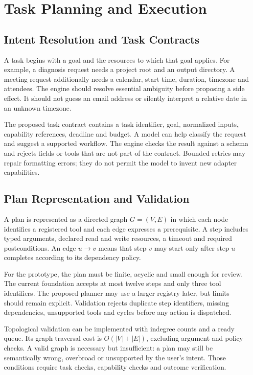 \chapter{Task Planning and Execution}
\section{Intent Resolution and Task Contracts}
A task begins with a goal and the resources to which that goal applies. For example, a diagnosis request needs a project root and an output directory. A meeting request additionally needs a calendar, start time, duration, timezone and attendees. The engine should resolve essential ambiguity before proposing a side effect. It should not guess an email address or silently interpret a relative date in an unknown timezone.

The proposed task contract contains a task identifier, goal, normalized inputs, capability references, deadline and budget. A model can help classify the request and suggest a supported workflow. The engine checks the result against a schema and rejects fields or tools that are not part of the contract. Bounded retries may repair formatting errors; they do not permit the model to invent new adapter capabilities.

\section{Plan Representation and Validation}
A plan is represented as a directed graph $G=(V,E)$ in which each node identifies a registered tool and each edge expresses a prerequisite. A step includes typed arguments, declared read and write resources, a timeout and required postconditions. An edge $u\rightarrow v$ means that step $v$ may start only after step $u$ completes according to its dependency policy.

For the prototype, the plan must be finite, acyclic and small enough for review. The current foundation accepts at most twelve steps and only three tool identifiers. The proposed planner may use a larger registry later, but limits should remain explicit. Validation rejects duplicate step identifiers, missing dependencies, unsupported tools and cycles before any action is dispatched.

Topological validation can be implemented with indegree counts and a ready queue. Its graph traversal cost is $O(|V|+|E|)$, excluding argument and policy checks. A valid graph is necessary but insufficient: a plan may still be semantically wrong, overbroad or unsupported by the user's intent. Those conditions require task checks, capability checks and outcome verification.

